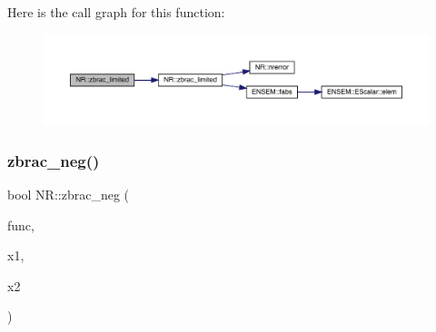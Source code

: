 Here is the call graph for this function\+:
\nopagebreak
\begin{figure}[H]
\begin{center}
\leavevmode
\includegraphics[width=350pt]{da/d46/namespaceNR_a843139adc6ba0089d6840b84ea7e935a_cgraph}
\end{center}
\end{figure}
\mbox{\label{namespaceNR_a4f88ac71576d19d1bb1e167e6f5b1bdc}} 
\subsubsection{\texorpdfstring{zbrac\_neg()}{zbrac\_neg()}\hspace{0.1cm}{\footnotesize\ttfamily [1/2]}}
{\footnotesize\ttfamily bool N\+R\+::zbrac\+\_\+neg (\begin{DoxyParamCaption}\item[{const \mbox{\hyperlink{classNR_1_1ScalFunc}{Scal\+Func}} \&}]{func,  }\item[{\mbox{\hyperlink{namespaceNR_af6ff762dd605ff477b8e52387253a02a}{DP}} \&}]{x1,  }\item[{\mbox{\hyperlink{namespaceNR_af6ff762dd605ff477b8e52387253a02a}{DP}} \&}]{x2 }\end{DoxyParamCaption})}

